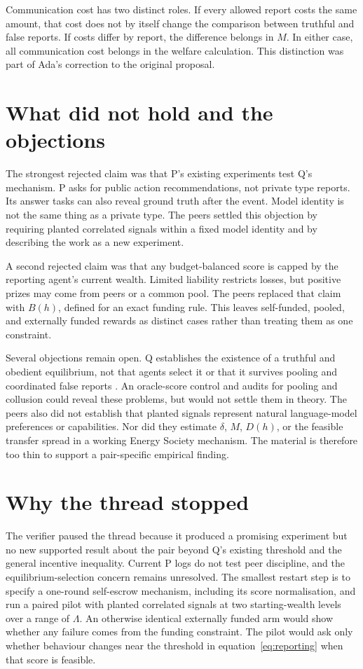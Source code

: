 \documentclass{article}
\begin{document}
Communication cost has two distinct roles.  If every allowed report costs the same amount, that cost does not by itself change the comparison between truthful and false reports.  If costs differ by report, the difference belongs in $M$.  In either case, all communication cost belongs in the welfare calculation.  This distinction was part of Ada's correction to the original proposal.

\section{What did not hold and the objections}

The strongest rejected claim was that P's existing experiments test Q's mechanism.  P asks for public action recommendations, not private type reports.  Its answer tasks can also reveal ground truth after the event.  Model identity is not the same thing as a private type.  The peers settled this objection by requiring planted correlated signals within a fixed model identity and by describing the work as a new experiment.

A second rejected claim was that any budget-balanced score is capped by the reporting agent's current wealth.  Limited liability restricts losses, but positive prizes may come from peers or a common pool.  The peers replaced that claim with $B(h)$, defined for an exact funding rule.  This leaves self-funded, pooled, and externally funded rewards as distinct cases rather than treating them as one constraint.

Several objections remain open.  Q establishes the existence of a truthful and obedient equilibrium, not that agents select it or that it survives pooling and coordinated false reports \cite{Q}.  An oracle-score control and audits for pooling and collusion could reveal these problems, but would not settle them in theory.  The peers also did not establish that planted signals represent natural language-model preferences or capabilities.  Nor did they estimate $\delta$, $M$, $D(h)$, or the feasible transfer spread in a working Energy Society mechanism.  The material is therefore too thin to support a pair-specific empirical finding.

\section{Why the thread stopped}

The verifier paused the thread because it produced a promising experiment but no new supported result about the pair beyond Q's existing threshold and the general incentive inequality.  Current P logs do not test peer discipline, and the equilibrium-selection concern remains unresolved.  The smallest restart step is to specify a one-round self-escrow mechanism, including its score normalisation, and run a paired pilot with planted correlated signals at two starting-wealth levels over a range of $\Lambda$.  An otherwise identical externally funded arm would show whether any failure comes from the funding constraint.  The pilot would ask only whether behaviour changes near the threshold in equation~\ref{eq:reporting} when that score is feasible.



\end{document}
